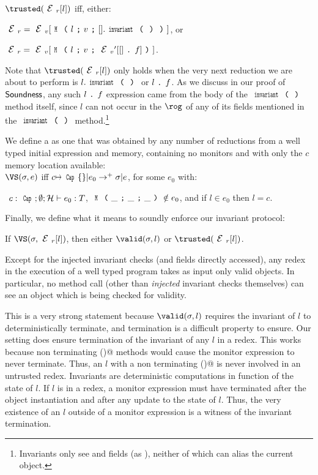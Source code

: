 \indent $\trusted(\ER[l])$ iff, either:
\begin{iitemize}
\item $\ER=\EV[\M{l}{v}{\hole.\invariant}]$, or
\item $\ER=\EV[\M{l}{v}{\EV'[\hole\singleDot f]}]$.
\end{iitemize}
Note that $\trusted(\ER[l])$ only holds when the very next reduction we are about to perform is $l.\invariant$ or $l{ \mbox{ {\texttt{.}} } } f$.
As we discuss in our proof of $\textsf{Soundness}$,
any such $l{ \mbox{ {\texttt{.}} } } f$ expression came from the body of the $\invariant$ method itself, since $l$ can not occur in the $\rog$ of any of its fields mentioned in the $\invariant$ method.\footnote{
Invariants only see \Q@imm@ and \Q@capsule@ fields (as \Q@read@), neither of which can alias the current object.
}

We define a \VS as one that was obtained by any number of reductions from a well typed initial expression and memory, containing no monitors and with only the $c$ memory location available:\\
\indent $\VS(\s, e)$ iff $c\mapsto\Kw{Cap}\{\}|e_0\rightarrow^+ \s|e$, for some $e_0$ with:
\begin{iitemize}
\item[] ${}_{}$\quad${}_{}$ $c:\Kw{Cap};\emptyset; \h \vdash e_0: 	T$, $\M{\_}{\_}{\_} \notin e_0$, and if $l \in e_0$ then $l = c$.
\end{iitemize}

\noindent Finally, we define what it means to soundly enforce our invariant protocol:
\SS\begin{theorem}[Soundness]\rm
If $\VS(\s, \ER[l])$, then either $\valid(\s,l)$ or $\trusted(\ER[l])$.
\end{theorem}
Except for the injected invariant checks (and fields directly accessed),
any redex in the execution of a well typed program takes as input only valid objects.
In particular, no method call (other than \emph{injected} invariant checks themselves) can see an object which is being checked for validity.

This is a very strong statement because $\valid(\s,l)$ requires 
the invariant of $l$ to deterministically terminate, and termination is a difficult 
property to ensure.
Our setting does ensure termination of the invariant of any $l$ in a redex.
This works because non terminating \Q@invariant()@ methods would cause the monitor expression to never terminate. Thus, an
$l$ with a non terminating \Q@invariant()@ is never involved in an untrusted redex.
Invariants are deterministic computations in function of the state of $l$.
If $l$ is in a redex, a monitor expression must have terminated after the object instantiation
and after any update to the state of $l$.
Thus, the very existence of an $l$ outside of a monitor expression
is a witness of the invariant termination.

